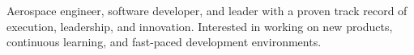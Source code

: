 \documentclass[a4paper]{article}
\begin{document}
Aerospace engineer, software developer, and leader with a proven track record of execution, leadership, and innovation. Interested in working on new products, continuous learning, and fast-paced development environments.
\linebreak
\linebreak
{}






\end{document}
